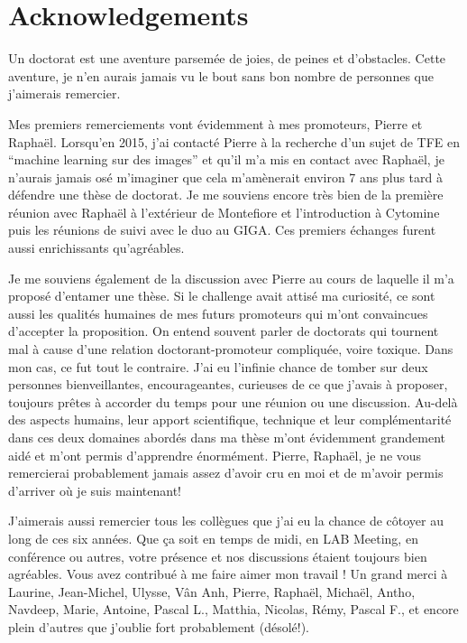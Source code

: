 \chapter*{Acknowledgements}

Un doctorat est une aventure parsemée de joies, de peines et d'obstacles. Cette aventure, je n'en aurais jamais vu le bout sans bon nombre de personnes que j'aimerais remercier. 

\vspace{15pt}

Mes premiers remerciements vont évidemment à mes promoteurs, Pierre et Raphaël. Lorsqu'en 2015, j'ai contacté Pierre à la recherche d'un sujet de TFE en ``machine learning sur des images'' et qu'il m'a mis en contact avec Raphaël, je n'aurais jamais osé m'imaginer que cela m'amènerait environ 7 ans plus tard à défendre une thèse de doctorat. Je me souviens encore très bien de la première réunion avec Raphaël à l'extérieur de Montefiore et l'introduction à Cytomine puis les réunions de suivi avec le duo au GIGA. Ces premiers échanges furent aussi enrichissants qu'agréables.

Je me souviens également de la discussion avec Pierre au cours de laquelle il m'a proposé d'entamer une thèse. Si le challenge avait attisé ma curiosité, ce sont aussi les qualités humaines de mes futurs promoteurs qui m'ont convaincues d'accepter la proposition. On entend souvent parler de doctorats qui tournent mal à cause d'une relation doctorant-promoteur compliquée, voire toxique. Dans mon cas, ce fut tout le contraire. J'ai eu l'infinie chance de tomber sur deux personnes bienveillantes, encourageantes, curieuses de ce que j'avais à proposer, toujours prêtes à accorder du temps pour une réunion ou une discussion. Au-delà des aspects humains, leur apport scientifique, technique et leur complémentarité dans ces deux domaines abordés dans ma thèse m'ont évidemment grandement aidé et m'ont permis d'apprendre énormément. Pierre, Raphaël, je ne vous remercierai probablement jamais assez d'avoir cru en moi et de m'avoir permis d'arriver où je suis maintenant!

\vspace{15pt}

J'aimerais aussi remercier tous les collègues que j'ai eu la chance de côtoyer au long de ces six années. Que ça soit en temps de midi, en LAB Meeting, en conférence ou autres, votre présence et nos discussions étaient toujours bien agréables. Vous avez contribué à me faire aimer mon travail ! Un grand merci à Laurine, Jean-Michel, Ulysse, Vân Anh, Pierre, Raphaël, Michaël, Antho, Navdeep, Marie, Antoine, Pascal L., Matthia, Nicolas, Rémy, Pascal F., et encore plein d'autres que j'oublie fort probablement (désolé!).

